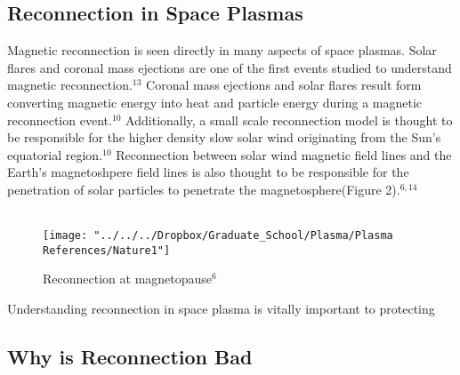 \documentclass{article}
\begin{document}
\subsection{Reconnection in Space Plasmas}
Magnetic reconnection is seen directly in many aspects of space plasmas.  Solar flares and coronal mass ejections are one of the first events studied to understand magnetic reconnection.$^{13}$  Coronal mass ejections and solar flares result form converting magnetic energy into heat and particle energy during a magnetic reconnection event.$^{10}$  Additionally, a small scale reconnection model is thought to be responsible for the higher density slow solar wind originating from the Sun's equatorial region.$^{10}$  Reconnection between solar wind magnetic field lines and the Earth's magnetoshpere field lines is also thought to be responsible for the penetration of solar particles to penetrate the magnetosphere(Figure 2).$^{6,14}$\\\\\begin{figure}
\centering
\texttt{[image: "../../../Dropbox/Graduate\_School/Plasma/Plasma References/Nature1"]}
\caption{Reconnection at magnetopause$^{6}$}
\label{fig:Nature1}
\end{figure}

Understanding reconnection in space plasma is vitally important to protecting
\subsection{Why is Reconnection Bad}
\end{document}
